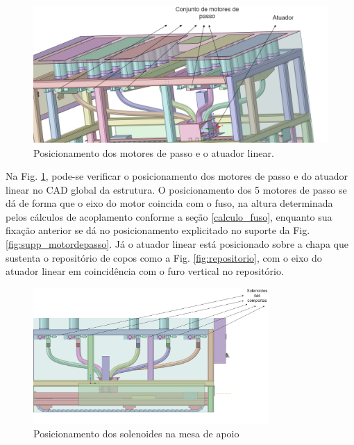 \begin{figure}[H]
        \centering
        \includegraphics[width=1.1\textwidth]{figuras/estrutura/Design/Diagrama_passo.png}
        \caption{Posicionamento dos motores de passo e o atuador linear.}
        \label{fig:Vista_sensores_1}
    \end{figure}

Na Fig. \ref{fig:Vista_sensores_1}, pode-se verificar o posicionamento dos motores de passo e do atuador linear no CAD global da estrutura. O posicionamento dos 5 motores de passo se dá de forma que o eixo do motor coincida com o fuso, na altura determinada pelos cálculos de acoplamento conforme a seção \ref{calculo_fuso}, enquanto sua fixação anterior se dá no posicionamento explicitado no suporte da Fig. \ref{fig:supp_motordepasso}. Já o atuador linear está posicionado sobre a chapa que sustenta o repositório de copos como a Fig. \ref{fig:repositorio}, com o eixo do atuador linear em coincidência com o furo vertical no repositório.

\begin{figure}[H]
        \centering
        \includegraphics[width=0.8\textwidth]{figuras/estrutura/Design/Diagrama_solenoides.png}
        \caption{Posicionamento dos solenoides na mesa de apoio}
        \label{fig:Vista_solenoides}
    \end{figure}

